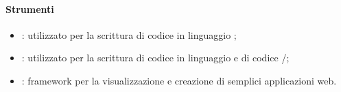     \paragraph{Strumenti} \hfill \break
    \begin{itemize}
  \item \textbf{}: utilizzato per la scrittura di codice in linguaggio ;
  \item \textbf{}: utilizzato per la scrittura di codice in linguaggio  e di codice /;
  \item \textbf{}: framework  per la visualizzazione e creazione di semplici applicazioni web.
\end{itemize}

